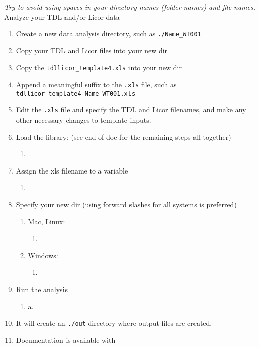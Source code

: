 {\em Try to avoid using spaces in your directory names (folder names) and file names.} \\

\noindent
Analyze your TDL and/or Licor data
\begin{enumerate}
\item Create a new data analysis directory, such as \verb|./Name_WT001|
\item Copy your TDL and Licor files into your new dir
\item Copy the \verb|tdllicor_template4.xls| into your new dir
\item Append a meaningful suffix to the \verb|.xls| file, such as \verb|tdllicor_template4_Name_WT001.xls|
\item Edit the \verb|.xls| file and specify the TDL and Licor filenames, and make any other necessary changes to template inputs.
\item Load the library: (see end of doc for the remaining steps all together)
  \begin{enumerate}
  \item {}
  \end{enumerate}
\item Assign the xls filename to a variable
  \begin{enumerate}
  \item {}
  \end{enumerate}
\item Specify your new dir (using forward slashes for all systems is preferred)
  \begin{enumerate}
  \item Mac, Linux:
    \begin{enumerate}
    \item {}
    \end{enumerate}
  \item Windows:
    \begin{enumerate}
    \item {}
    \end{enumerate}
  \end{enumerate}
\item Run the analysis
  \begin{enumerate}
  \item a.  
  \end{enumerate}
\item It will create an \verb|./out| directory where output files are created.
\item Documentation is available with 
\end{enumerate}

